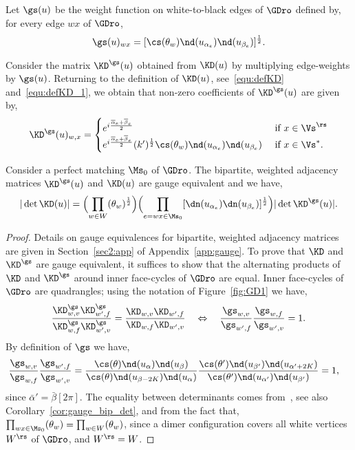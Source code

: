 \documentclass[a4paper,twoside,11pt]{article}
\begin{document}
Let $\gs(u)$ be the weight function on white-to-black edges of $\GDro$ defined by, for every edge $wx$ of $\GDro$, 
\begin{equation*}
\gs(u)_{wx}=
[\cs(\theta_w)\nd(u_{\alpha_e})\nd(u_{\beta_e})]^{\frac{1}{2}}.
\end{equation*}

Consider the matrix $\KD^{\gs}(u)$ obtained from $\KD(u)$ by multiplying edge-weights by $\gs(u)$. Returning to the definition 
of $\KD(u)$, see~\eqref{equ:defKD} and~\eqref{equ:defKD_1}, we obtain that non-zero coefficients of $\KD^\gs(u)$ are given by,
\begin{align*}
\KD^\gs(u)_{w,x}=
\begin{cases}
e^{i\frac{\overline{\alpha}_e+\overline{\beta}_e}{2}} &\text{ if $x\in\Vs^\rs$}\\
e^{i\frac{\overline{\alpha}_e+\overline{\beta}_e}{2}}
(k')^\frac{1}{2} \cs(\theta_w)\nd({u_{\alpha_e}})\nd({u_{\beta_e}})
&\text{ if $x\in\Vs^*$}.
\end{cases}
\end{align*}

\begin{lem}\label{lem:K_Kg}
Consider a perfect matching $\Ms_0$ of $\GDro$.
The bipartite, weighted adjacency matrices $\KD^\gs(u)$ and $\KD(u)$ are gauge equivalent and we have,
\begin{equation}\label{equ:lem_K_Kg}
|\det\KD(u)|=\Bigl(\prod_{w\in W}\sc(\theta_w)^\frac{1}{2}\Bigr)
\Bigl(\prod_{e=wx\in\Ms_0} [\dn(u_{\alpha_e})\dn(u_{\beta_e})]^{\frac{1}{2}}  \Bigr)|\det\KD^\gs(u)|. 
\end{equation}
\end{lem}
\begin{proof}
Details on gauge equivalences for bipartite, weighted adjacency matrices are given in Section~\ref{sec2:app} of Appendix~\ref{app:gauge}.
To prove that $\KD$ and $\KD^\gs$ are gauge equivalent, it suffices to show that the alternating products
of $\KD$ and $\KD^\gs$ around inner face-cycles of $\GDro$ are equal. Inner face-cycles of $\GDro$ are quadrangles; using the notation of 
Figure~\ref{fig:GD1} we have,
\[
\frac{\KD^\gs_{w,v}\KD^\gs_{w',f}}{\KD^\gs_{w,f}\KD^\gs_{w',v}}=
\frac{\KD_{w,v}\KD_{w',f}}{\KD_{w,f}\KD_{w',v}}\quad \Leftrightarrow\quad
\frac{{\gs}_{w,v}}{{\gs}_{w',f}}\frac{{\gs}_{w,f}}{{\gs}_{w',v}}=1.
\]
By definition of $\gs$ we have,
\begin{align*}
\frac{{\gs}_{w,v}}{{\gs}_{w,f}}\frac{{\gs}_{w',f}}{{\gs}_{w',v}}&=
\frac{\cs(\theta)\nd(u_\alpha)\nd(u_\beta)}{\cs(\theta)\nd(u_{\beta-2K})\nd(u_{\alpha})} 
\frac{\cs(\theta')\nd(u_{\beta'})\nd(u_{\alpha'+2K})}{\cs(\theta')\nd(u_{\alpha'})\nd(u_{\beta'})
}=1,
\end{align*}
since $\bar{\alpha}'=\bar{\beta}[2\pi]$. The equality between determinants comes from~\cite{Kuperberg}, see also
Corollary~\ref{cor:gauge_bip_det},
and from the fact that, $\prod_{wx\in\Ms_0}\sc(\theta_w)=\prod_{w\in W}\sc(\theta_w)$, since a dimer configuration covers all 
white vertices $W^\rs$ of $\GDro$, and $W^\rs=W$.
\end{proof}
\end{document}
